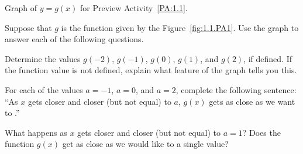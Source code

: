 \begin{marginfigure}[8cm]
\caption{Graph of $y = g(x)$ for Preview Activity~\ref{PA:1.1}.} \label{fig:1.1.PA1}
\end{marginfigure}

\begin{pa} \label{PA:1.1}
Suppose that $g$ is the function given by the Figure~\ref{fig:1.1.PA1}.  Use the graph to answer each of the following questions. 
\ba
	\item Determine the values $g(-2)$, $g(-1)$, $g(0)$, $g(1)$, and $g(2)$, if defined.  If the function value is not defined, explain what feature of the graph tells you this.
	\item For each of the values $a = -1$, $a = 0$, and $a = 2$, complete the following sentence: ``As $x$ gets closer and closer (but not equal) to $a$, $g(x)$ gets as close as we want to \underline{\hspace{0.3in}}.''
	\item What happens as $x$ gets closer and closer (but not equal) to $a = 1$?  Does the function $g(x)$ get as close as we would like to a single value?
\ea

\end{pa} \afterpa